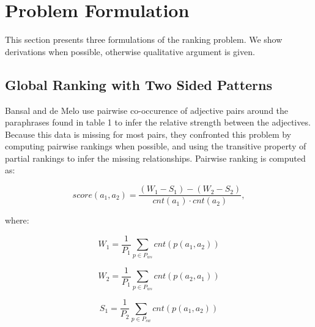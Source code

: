 \documentclass[11pt,letterpaper]{article}
\begin{document}



\section{Problem Formulation}

This section presents three formulations of the ranking problem. We show derivations when possible, otherwise qualitative argument is given.

\subsection{Global Ranking with Two Sided Patterns}

Bansal and de Melo  use pairwise co-occurence of adjective pairs around the paraphrases found in table 1 to infer the relative strength between the adjectives. Because this data is missing for most pairs, they confronted this problem by computing pairwise rankings when possible, and using the transitive property of partial rankings to infer the missing relationships. Pairwise ranking is computed as:

\[ score(a_1, a_2) = \frac{(W_1 - S_1) - (W_2 - S_2)}{cnt(a_1) \cdot cnt(a_2)}, \]

where:

\[ W_1 = \frac{1}{P_1} \sum_{p \in P_{ws}} cnt(p(a_1, a_2))\]

\[ W_2 = \frac{1}{P_1} \sum_{p \in P_{ws}} cnt(p(a_2, a_1))\]

\[ S_1 = \frac{1}{P_2} \sum_{p \in P_{sw}} cnt(p(a_1, a_2))\]
\end{document}
